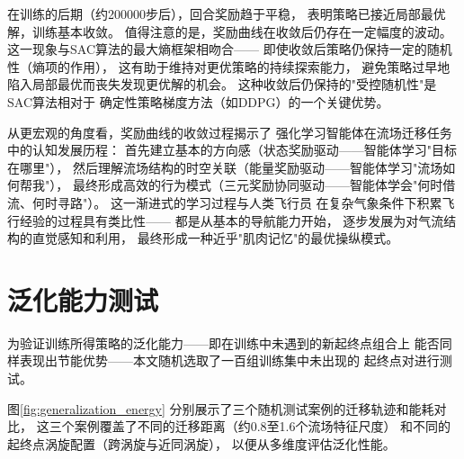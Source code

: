 在训练的后期（约200000步后），回合奖励趋于平稳，
表明策略已接近局部最优解，训练基本收敛。
值得注意的是，奖励曲线在收敛后仍存在一定幅度的波动。
这一现象与SAC算法的最大熵框架相吻合——
即使收敛后策略仍保持一定的随机性（熵项的作用），
这有助于维持对更优策略的持续探索能力，
避免策略过早地陷入局部最优而丧失发现更优解的机会。
这种收敛后仍保持的"受控随机性"是SAC算法相对于
确定性策略梯度方法（如DDPG）的一个关键优势。

从更宏观的角度看，奖励曲线的收敛过程揭示了
强化学习智能体在流场迁移任务中的认知发展历程：
首先建立基本的方向感（状态奖励驱动——智能体学习"目标在哪里"），
然后理解流场结构的时空关联（能量奖励驱动——智能体学习"流场如何帮我"），
最终形成高效的行为模式（三元奖励协同驱动——智能体学会"何时借流、何时寻路"）。
这一渐进式的学习过程与人类飞行员
在复杂气象条件下积累飞行经验的过程具有类比性——
都是从基本的导航能力开始，
逐步发展为对气流结构的直觉感知和利用，
最终形成一种近乎"肌肉记忆"的最优操纵模式。

\section{泛化能力测试}

为验证训练所得策略的泛化能力——即在训练中未遇到的新起终点组合上
能否同样表现出节能优势——本文随机选取了一百组训练集中未出现的
起终点对进行测试。

图\ref{fig:generalization_energy}
分别展示了三个随机测试案例的迁移轨迹和能耗对比，
这三个案例覆盖了不同的迁移距离（约0.8至1.6个流场特征尺度）
和不同的起终点涡旋配置（跨涡旋与近同涡旋），
以便从多维度评估泛化性能。

